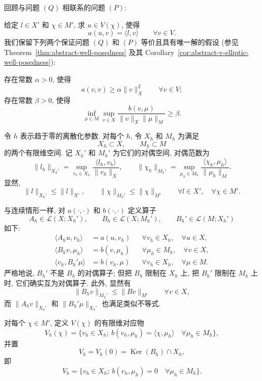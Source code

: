 回顾与问题 $(Q)$ 相联系的问题 $(P)$:

给定 $l\in X'$ 和 $\chi\in M'$, 求 $u\in V(\chi)$, 使得
\begin{equation}\label{eq:primitive-abstract-p}
a(u,v)=\langle l,v\rangle
\qquad\forall v\in V.
\end{equation}
我们保留下列两个保证问题 $(Q)$ 和 $(P)$ 等价且具有唯一解的假设
(参见 Theorem~\ref{thm:abstract-well-posedness} 及其
Corollary~\ref{cor:abstract-v-elliptic-well-posedness}):

存在常数 $\alpha>0$, 使得
\begin{equation}\label{eq:primitive-continuous-ellipticity}
a(v,v)\geq\alpha\|v\|_X^2
\qquad\forall v\in V;
\end{equation}
存在常数 $\beta>0$, 使得
\begin{equation}\label{eq:primitive-continuous-inf-sup}
\inf_{\mu\in M}\sup_{v\in X}
\frac{b(v,\mu)}{\|v\|_X\|\mu\|_M}
\geq\beta.
\end{equation}

令 $h$ 表示趋于零的离散化参数. 对每个 $h$, 令 $X_h$ 和 $M_h$
为满足
\[
X_h\subset X,
\qquad
M_h\subset M
\]
的两个有限维空间. 记 $X_h'$ 和 $M_h'$ 为它们的对偶空间, 对偶范数为
\[
\|l_h\|_{X_h'}=
\sup_{v_h\in X_h}\frac{\langle l_h,v_h\rangle}{\|v_h\|_X},
\qquad
\|\chi_h\|_{M_h'}=
\sup_{\mu_h\in M_h}\frac{\langle\chi_h,\mu_h\rangle}{\|\mu_h\|_M}.
\]
显然,
\[
\|l\|_{X_h'}\leq\|l\|_{X'},
\qquad
\|\chi\|_{M_h'}\leq\|\chi\|_{M'}
\qquad\forall l\in X',\quad\forall\chi\in M'.
\]

与连续情形一样, 对 $a(\cdot,\cdot)$ 和 $b(\cdot,\cdot)$ 定义算子
\[
A_h\in\mathcal L(X;X_h'),
\qquad
B_h\in\mathcal L(X;M_h'),
\qquad
B_h'\in\mathcal L(M;X_h')
\]
如下:
\begin{align*}
\langle A_hu,v_h\rangle&=a(u,v_h)
&&\forall v_h\in X_h,\quad\forall u\in X,\\
\langle B_hv,\mu_h\rangle&=b(v,\mu_h)
&&\forall\mu_h\in M_h,\quad\forall v\in X,\\
\langle v_h,B_h'\mu\rangle&=b(v_h,\mu)
&&\forall v_h\in X_h,\quad\forall\mu\in M.
\end{align*}
严格地说, $B_h'$ 不是 $B_h$ 的对偶算子; 但把 $B_h$ 限制在 $X_h$ 上,
把 $B_h'$ 限制在 $M_h$ 上时, 它们确实互为对偶算子. 此外, 显然有
\[
\|B_hv\|_{M_h'}\leq\|Bv\|_{M'}
\qquad\forall v\in X,
\]
而 $\|A_hv\|_{X_h'}$ 和 $\|B_h'\mu\|_{X_h'}$ 也满足类似不等式.

对每个 $\chi\in M'$, 定义 $V(\chi)$ 的有限维对应物
\[
V_h(\chi)=\{v_h\in X_h;\ b(v_h,\mu_h)=\langle\chi,\mu_h\rangle
\quad\forall\mu_h\in M_h\},
\]
并置
\[
V_h=V_h(0)=\operatorname{Ker}(B_h)\cap X_h,
\]
即
\begin{equation}\label{eq:primitive-discrete-kernel}
V_h=\{v_h\in X_h;\ b(v_h,\mu_h)=0
\quad\forall\mu_h\in M_h\}.
\end{equation}

